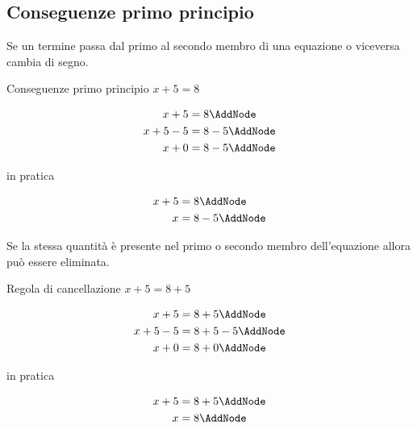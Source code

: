\subsection{Conseguenze primo principio}
Se un termine passa  dal primo al secondo membro di una equazione o viceversa cambia di segno.
\begin{esempiot}{Conseguenze primo principio}{}
$ x+5 = 8$
\end{esempiot}
\begin{NodesList}[dy=5pt,margin=3cm]
 \[ %
 \begin{aligned}
 x+5 &= 8 \AddNode\\
 x +5-5 &= 8-5 \AddNode\\
 x + 0 &= 8-5 \AddNode
 \end{aligned}
 \]
 \end{NodesList}
 in pratica
 \begin{NodesList}[dy=5pt,margin=3cm]
  \[ %
  \begin{aligned}
  x+5 &= 8 \AddNode\\
  x  &= 8-5 \AddNode
  \end{aligned}
  \]
  \end{NodesList}
Se la stessa quantità è presente nel primo o secondo membro dell'equazione allora può essere eliminata.
\begin{esempiot}{Regola di cancellazione}{}
$ x+5 = 8+5$
\end{esempiot}
\begin{NodesList}[dy=5pt,margin=3cm]
 \[ %
 \begin{aligned}
 x+5 &= 8+5 \AddNode\\
 x +5-5 &= 8+5-5 \AddNode\\
 x + 0 &= 8+0 \AddNode
 \end{aligned}
 \]
 \end{NodesList}
 in pratica
 \begin{NodesList}[dy=5pt,margin=3cm]
  \[ %
  \begin{aligned}
  x+5 &= 8+5 \AddNode\\
  x  &= 8 \AddNode
  \end{aligned}
  \]
  \end{NodesList}

